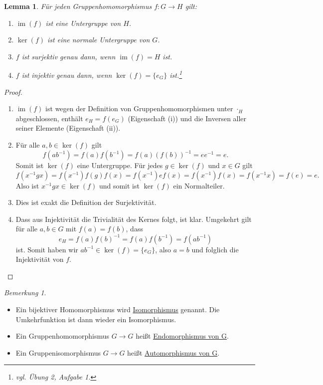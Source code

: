 \documentclass[12pt]{scrartcl} %
\DeclareMathOperator{\im}{im}
\newtheorem{lemma}{Lemma}
\theoremstyle{definition}
\theoremstyle{remark}
\newtheorem*{nb}{Bemerkung}
\begin{document}
\begin{lemma}
	Für jeden Gruppenhomomorphismus $ f: G \rightarrow H$ gilt:
	\begin{enumerate}[label=(\roman*)]
	\item $\im(f)$ ist eine Untergruppe von $H$.
	\item $\ker(f)$ ist eine normale Untergruppe von $G$.
	\item $f$ ist surjektiv genau dann, wenn $\im(f) = H$ ist.
	\item $f$ ist injektiv genau dann, wenn $\ker(f) = \{e_G\}$ ist.\footnote{vgl. Übung 2, Aufgabe 1.}
	\end{enumerate}
\end{lemma}

\begin{proof}
	\begin{enumerate}[label=(\roman*)]
	\item $\im(f)$ ist wegen der Definition von Gruppenhomomorphismen unter $\cdot_H$ abgeschlossen, enthält $e_H = f(e_G)$ (Eigenschaft (i)) und die Inversen aller seiner Elemente (Eigenschaft (ii)).
	\item Für alle $a, b \in \ker(f)$ gilt
		$$ f(ab^{-1}) = f(a)f(b^{-1}) = f(a)(f(b))^{-1} = ee^{-1} = e.$$
		Somit ist $\ker(f)$ eine Untergruppe.
		Für jedes $ g \in \ker(f)$ und $x \in G$ gilt
		$$ f(x^{-1}gx) = f(x^{-1})f(g)f(x) = f(x^{-1}) e f(x) = f(x^{-1})f(x) = f(x^{-1}x) = f(e) = e.$$
		Also ist $x^{-1}gx \in \ker(f) $ und somit ist $\ker(f)$ ein Normalteiler.
	\item Dies ist exakt die Definition der Surjektivität.
	\item Dass aus Injektivität die Trivialität des Kernes folgt, ist klar.
		Umgekehrt gilt für alle \(a, b \in G\) mit \(f(a) = f(b)\), dass \[e_H = f(a)f(b)^{-1} =f(a)f(b^{-1}) = f(ab^{-1})\] ist.
		Somit haben wir \(ab^{-1} \in \ker(f) = \{e_G\}\), also \(a = b\) und folglich die Injektivität von \(f\). \qedhere
	\end{enumerate}	
\end{proof}

\begin{nb}
	\begin{itemize}
	\item Ein bijektiver Homomorphismus wird \underline{Isomorphismus} genannt. Die Umkehrfunktion ist dann wieder ein Isomorphismus.
	\item Ein Gruppenhomomorphismus $G \rightarrow G$ heißt \underline{Endomorphismus von G}.
	\item Ein Gruppenisomorphismus $G \rightarrow G$ heißt \underline{Automorphismus von G}.
	\end{itemize}
\end{nb}
\end{document}

